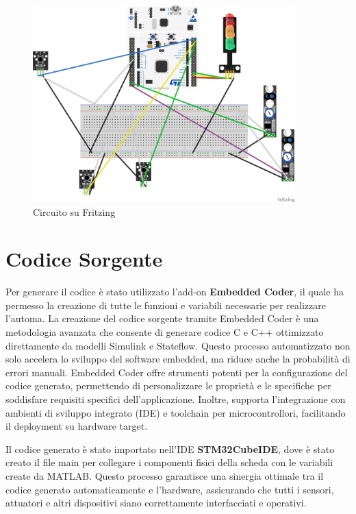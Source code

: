        \begin{figure}[H]
            \centering
            \includegraphics[width=0.9\textwidth]{figures/sketch_bb.png}
            \caption{Circuito su Fritzing}
            \label{sketch}
        \end{figure}


    \section{Codice Sorgente}
        Per generare il codice è stato utilizzato l'add-on \textbf{Embedded Coder}, il quale ha permesso la creazione di tutte le funzioni e variabili necessarie per realizzare l'automa. La creazione del codice sorgente tramite Embedded Coder è una metodologia avanzata che consente di generare codice C e C++ ottimizzato direttamente da modelli Simulink e Stateflow. Questo processo automatizzato non solo accelera lo sviluppo del software embedded, ma riduce anche la probabilità di errori manuali. Embedded Coder offre strumenti potenti per la configurazione del codice generato, permettendo di personalizzare le proprietà e le specifiche per soddisfare requisiti specifici dell'applicazione. Inoltre, supporta l'integrazione con ambienti di sviluppo integrato (IDE) e toolchain per microcontrollori, facilitando il deployment su hardware target.

        Il codice generato è stato importato nell'IDE \textbf{STM32CubeIDE}, dove è stato creato il file main per collegare i componenti fisici della scheda con le variabili create da MATLAB. Questo processo garantisce una sinergia ottimale tra il codice generato automaticamente e l'hardware, assicurando che tutti i sensori, attuatori e altri dispositivi siano correttamente interfacciati e operativi.

